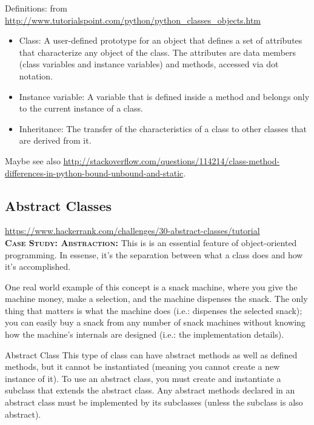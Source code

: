 \documentclass[11pt,a4paper]{article}
\begin{document}
Definitions: 
from \href{http://www.tutorialspoint.com/python/python\_classes\_objects.htm}{http://www.tutorialspoint.com/python/python\_classes\_objects.htm}
\begin{itemize}
\item{Class: A user-defined prototype for an object that defines a set of
    attributes that characterize any object of the class. The attributes
    are data members (class variables and instance variables) and methods,
    accessed via dot notation.}


\item{Instance variable: A variable that is defined inside a method
    and belongs only to the current instance of a class.}

\item{Inheritance: The transfer of the characteristics of a class to
    other classes that are derived from it.}
\end{itemize}

Maybe see also \href{http://stackoverflow.com/questions/114214/class-method-differences-in-python-bound-unbound-and-static}{http://stackoverflow.com/questions/114214/class-method-differences-in-python-bound-unbound-and-static}. 


    \subsection{Abstract Classes}
    \href{https://www.hackerrank.com/challenges/30-abstract-classes/tutorial}{https://www.hackerrank.com/challenges/30-abstract-classes/tutorial} \\

    \textbf{\textsc{Case Study: Abstraction:}}
    This is is an essential feature of object-oriented programming. In essense, it's the separation between what a class does and how it's accomplished. 

One real world example of this concept is a snack machine, where you
give the machine money, make a selection, and the machine dispenses
the snack. The only thing that matters is what the machine does (i.e.:
dispenses the selected snack); you can easily buy a snack from any
number of snack machines without knowing how the machine's internals
are designed (i.e.: the implementation details).

Abstract Class This type of class can have abstract methods as well as
defined methods, but it cannot be instantiated (meaning you cannot
create a new instance of it). To use an abstract class, you must
create and instantiate a subclass that extends the abstract class. Any
abstract methods declared in an abstract class must be implemented by
its subclasses (unless the subclass is also abstract).
\end{document}
